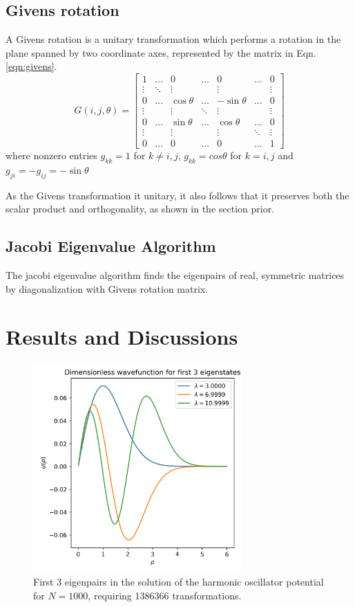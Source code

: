 \documentclass[10pt,showpacs,preprintnumbers,footinbib,amsmath,amssymb,aps,prl,twocolumn,groupedaddress,superscriptaddress,showkeys]{revtex4-1}
\begin{document}
\subsection{Givens rotation}
  A Givens rotation is a unitary transformation which performs a rotation in the plane spanned by two coordinate axes, represented by the matrix in Eqn. \ref{eqn:givens}.
  \begin{equation}
    \label{eqn:givens}
    G(i, j, \theta) = 
    \begin{bmatrix}
      1 & \dots & 0 & \dots & 0 & \dots & 0 \\
      \vdots & \ddots & \vdots & & \vdots & & \vdots \\
      0 &\dots & \cos\theta & \dots  & - \sin \theta & \dots & 0 \\
      \vdots && \vdots & \ddots & \vdots && \vdots \\
      0 & \dots & \sin \theta & \dots & \cos \theta & \dots & 0 \\
      \vdots && \vdots && \vdots & \ddots & \vdots \\
      0 & \dots & 0 & \dots & 0 & \dots & 1
    \end{bmatrix}
  \end{equation}
  where nonzero entries $g_{kk}=1$ for $k\neq i,j$, $g_{kk}=cos\theta$ for $k=i,j$ and $g_{ji} = -g_{ij} = -\sin \theta$ \cite{givens}

  As the Givens transformation it unitary, it also follows that it preserves both the scalar product and orthogonality, as shown in the section prior.

\subsection{Jacobi Eigenvalue Algorithm \label{subsec:jacobi_algo}}
    The jacobi eigenvalue algorithm finds the eigenpairs of real, symmetric matrices by diagonalization with Givens rotation matrix.

\section{Results and Discussions}
  \begin{figure}[h!]
    \center
    \includegraphics[width=8cm]{figs/question2d1000.png}
    \caption{First 3 eigenpairs in the solution of the harmonic oscillator potential for $N=1000$, requiring 1386366 transformations.}
  \end{figure}
\end{document}
